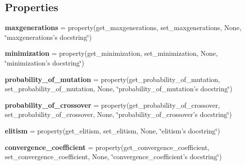 \subsection*{Properties}
\begin{DoxyCompactItemize}
\item 
\hypertarget{classsrc_1_1algorithms_1_1genetic__alg_1_1Params__GA_ad22cd0a6f7ecffd3d4ec7fc538507b2b}{
{\bfseries maxgenerations} = property(get\_\-maxgenerations, set\_\-maxgenerations, None, \char`\"{}maxgenerations's docstring\char`\"{})}
\label{classsrc_1_1algorithms_1_1genetic__alg_1_1Params__GA_ad22cd0a6f7ecffd3d4ec7fc538507b2b}

\item 
\hypertarget{classsrc_1_1algorithms_1_1genetic__alg_1_1Params__GA_ad6ae1a861a9cd985a6847bbd09310f0e}{
{\bfseries minimization} = property(get\_\-minimization, set\_\-minimization, None, \char`\"{}minimization's docstring\char`\"{})}
\label{classsrc_1_1algorithms_1_1genetic__alg_1_1Params__GA_ad6ae1a861a9cd985a6847bbd09310f0e}

\item 
\hypertarget{classsrc_1_1algorithms_1_1genetic__alg_1_1Params__GA_aa9da07255dd6a3b147412ec170925377}{
{\bfseries probability\_\-of\_\-mutation} = property(get\_\-probability\_\-of\_\-mutation, set\_\-probability\_\-of\_\-mutation, None, \char`\"{}probability\_\-of\_\-mutation's docstring\char`\"{})}
\label{classsrc_1_1algorithms_1_1genetic__alg_1_1Params__GA_aa9da07255dd6a3b147412ec170925377}

\item 
\hypertarget{classsrc_1_1algorithms_1_1genetic__alg_1_1Params__GA_ae261a91cdfe78fe7d2d65efc2ed9edc8}{
{\bfseries probability\_\-of\_\-crossover} = property(get\_\-probability\_\-of\_\-crossover, set\_\-probability\_\-of\_\-crossover, None, \char`\"{}probability\_\-of\_\-crossover's docstring\char`\"{})}
\label{classsrc_1_1algorithms_1_1genetic__alg_1_1Params__GA_ae261a91cdfe78fe7d2d65efc2ed9edc8}

\item 
\hypertarget{classsrc_1_1algorithms_1_1genetic__alg_1_1Params__GA_a719b13116c6bf801a8350a2ec8932bb8}{
{\bfseries elitism} = property(get\_\-elitism, set\_\-elitism, None, \char`\"{}elitism's docstring\char`\"{})}
\label{classsrc_1_1algorithms_1_1genetic__alg_1_1Params__GA_a719b13116c6bf801a8350a2ec8932bb8}

\item 
\hypertarget{classsrc_1_1algorithms_1_1genetic__alg_1_1Params__GA_a21b50b67485ac38955a046bbafd32929}{
{\bfseries convergence\_\-coefficient} = property(get\_\-convergence\_\-coefficient, set\_\-convergence\_\-coefficient, None, \char`\"{}convergence\_\-coefficient's docstring\char`\"{})}
\label{classsrc_1_1algorithms_1_1genetic__alg_1_1Params__GA_a21b50b67485ac38955a046bbafd32929}

\end{DoxyCompactItemize}


